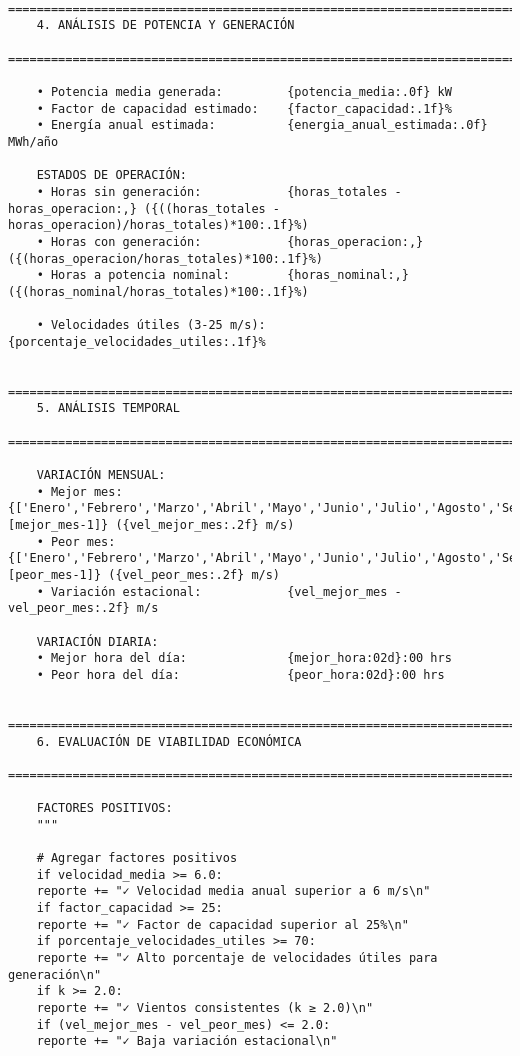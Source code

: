 \begin{lstlisting}
	==================================================================================
	4. ANÁLISIS DE POTENCIA Y GENERACIÓN
	==================================================================================
	
	• Potencia media generada:         {potencia_media:.0f} kW
	• Factor de capacidad estimado:    {factor_capacidad:.1f}%
	• Energía anual estimada:          {energia_anual_estimada:.0f} MWh/año
	
	ESTADOS DE OPERACIÓN:
	• Horas sin generación:            {horas_totales - horas_operacion:,} ({((horas_totales - horas_operacion)/horas_totales)*100:.1f}%)
	• Horas con generación:            {horas_operacion:,} ({(horas_operacion/horas_totales)*100:.1f}%)
	• Horas a potencia nominal:        {horas_nominal:,} ({(horas_nominal/horas_totales)*100:.1f}%)
	
	• Velocidades útiles (3-25 m/s):   {porcentaje_velocidades_utiles:.1f}%
	
	==================================================================================
	5. ANÁLISIS TEMPORAL
	==================================================================================
	
	VARIACIÓN MENSUAL:
	• Mejor mes:                       {['Enero','Febrero','Marzo','Abril','Mayo','Junio','Julio','Agosto','Septiembre','Octubre','Noviembre','Diciembre'][mejor_mes-1]} ({vel_mejor_mes:.2f} m/s)
	• Peor mes:                        {['Enero','Febrero','Marzo','Abril','Mayo','Junio','Julio','Agosto','Septiembre','Octubre','Noviembre','Diciembre'][peor_mes-1]} ({vel_peor_mes:.2f} m/s)
	• Variación estacional:            {vel_mejor_mes - vel_peor_mes:.2f} m/s
	
	VARIACIÓN DIARIA:
	• Mejor hora del día:              {mejor_hora:02d}:00 hrs
	• Peor hora del día:               {peor_hora:02d}:00 hrs
	
	==================================================================================
	6. EVALUACIÓN DE VIABILIDAD ECONÓMICA
	==================================================================================
	
	FACTORES POSITIVOS:
	"""
	
	# Agregar factores positivos
	if velocidad_media >= 6.0:
	reporte += "✓ Velocidad media anual superior a 6 m/s\n"
	if factor_capacidad >= 25:
	reporte += "✓ Factor de capacidad superior al 25%\n"
	if porcentaje_velocidades_utiles >= 70:
	reporte += "✓ Alto porcentaje de velocidades útiles para generación\n"
	if k >= 2.0:
	reporte += "✓ Vientos consistentes (k ≥ 2.0)\n"
	if (vel_mejor_mes - vel_peor_mes) <= 2.0:
	reporte += "✓ Baja variación estacional\n"
	

\end{lstlisting}
